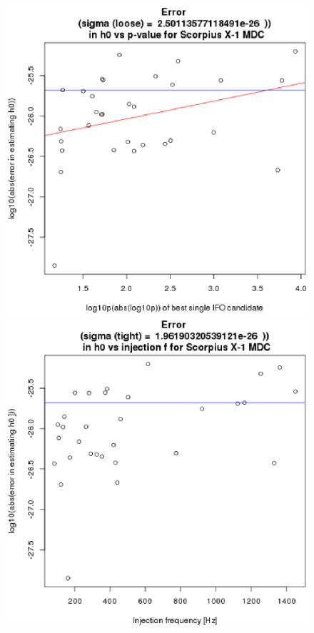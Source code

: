 \begin{figure}
\begin{center}
\includegraphics[width=0.3\paperwidth,height=0.2\paperheight]{Errorh0.eps}
\includegraphics[width=0.3\paperwidth,height=0.2\paperheight]{Errorh0vsF.eps}

\end{center}
\end{figure}
